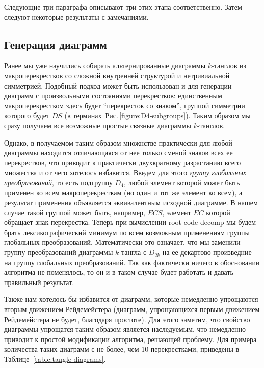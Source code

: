 \documentclass[12pt]{article}
\theoremstyle{plain}
\theoremstyle{definition}
\def\figureref#1{Рис.\,\protect\ref{#1}}
\def\RCD{\hbox{root-code-decomp}}
\begin{document}
		Следующие три параграфа описывают три этих этапа соответственно. Затем следуют некоторые результаты с замечаниями.

	\subsection{Генерация диаграмм}

		Ранее мы уже научились собирать альтернированные диаграммы $k$-танглов из макроперекрестков со сложной внутренней структурой и
		нетривиальной симметрией. Подобный подход может быть использован и для генерации диаграмм с произвольными состояниями перекрестков:
		единственным макроперекрестком здесь будет ``перекресток со знаком'', группой симметрии которого будет $DS$ (в
		терминах~\figureref{figure:D4-subgroups}). Таким образом мы сразу получаем все возможные простые связные диаграммы $k$-танглов.

		Однако, в получаемом таким образом множнстве практически для любой диаграммы находится отличающаяся от нее только сменой знаков
		всех ее перекрестков, что приводит к практически двухкратному разрастанию всего множества и от чего хотелось избавится. Введем
		для этого \textit{группу глобальных преобразований}, то есть подгруппу $D_4$, любой элемент которой может быть применен ко всем
		макроперекресткам (но один и тот же элемент ко всем), а результат применения объявляется эквивалентным исходной диаграмме. В нашем
		случае такой группой может быть, например, $ECS$, элемент $EC$ которой обращает знак перекрестка. Теперь при вычислении \RCD{} мы
		будем брать лексикографический минимум по всем возможным применениям группы глобальных преобразований. Математически это означает,
		что мы заменили группу преобразований диаграммы $k$-тангла с $D_{2k}$ на ее декартово произведние на группу глобальных преобразований.
		Так как фактически ничего в обосновании алгоритма не поменялось, то он и в таком случае будет работать и давать правильный результат.

		Также нам хотелось бы избавится от диаграмм, которые немедленно упрощаются вторым движением Рейдемейстера (диаграмм, упрощающихся
		первым движением Рейдемейстера не будет, благодаря простоте). Для этого заметим, что свойство диаграммы упрощатся таким образом
		является наследуемым, что немедленно приводит к простой модификации алгоритма, решающей проблему. Для примера количества таких
		диаграмм с не более, чем 10 перекрестками, приведены в Таблице~\ref{table:tangle-diagrams}.
\end{document}
